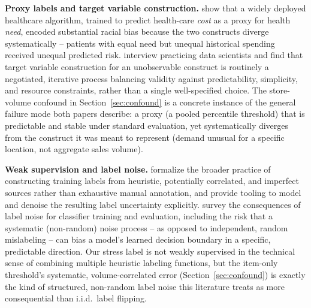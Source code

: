 \documentclass[11pt]{article}
\begin{document}
\textbf{Proxy labels and target variable construction.} \citet{obermeyer2019dissecting} show that a widely deployed healthcare algorithm, trained to predict health-care \emph{cost} as a proxy for health \emph{need}, encoded substantial racial bias because the two constructs diverge systematically -- patients with equal need but unequal historical spending received unequal predicted risk. \citet{guerdan2025measurement} interview practicing data scientists and find that target variable construction for an unobservable construct is routinely a negotiated, iterative process balancing validity against predictability, simplicity, and resource constraints, rather than a single well-specified choice. The store-volume confound in Section~\ref{sec:confound} is a concrete instance of the general failure mode both papers describe: a proxy (a pooled percentile threshold) that is predictable and stable under standard evaluation, yet systematically diverges from the construct it was meant to represent (demand unusual for a specific location, not aggregate sales volume).

\textbf{Weak supervision and label noise.} \citet{ratner2017snorkel} formalize the broader practice of constructing training labels from heuristic, potentially correlated, and imperfect sources rather than exhaustive manual annotation, and provide tooling to model and denoise the resulting label uncertainty explicitly. \citet{frenay2014classification} survey the consequences of label noise for classifier training and evaluation, including the risk that a systematic (non-random) noise process -- as opposed to independent, random mislabeling -- can bias a model's learned decision boundary in a specific, predictable direction. Our stress label is not weakly supervised in the technical sense of combining multiple heuristic labeling functions, but the item-only threshold's systematic, volume-correlated error (Section~\ref{sec:confound}) is exactly the kind of structured, non-random label noise this literature treats as more consequential than i.i.d.\ label flipping.
\end{document}
